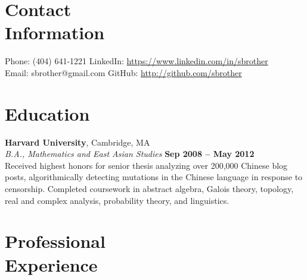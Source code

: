 \documentclass[margin,line]{resume}
\begin{document}
\begin{resume}
    \section{\mysidestyle Contact\\Information}

    Phone: (404) 641-1221       \hfill LinkedIn: \url{https://www.linkedin.com/in/sbrother} \\
    \noindent Email: sbrother@gmail.com  \hfill GitHub: \url{http://github.com/sbrother} \vspace{0mm}\\\vspace{-4.5mm}

    \section{\mysidestyle Education}

    \textbf{Harvard University}, Cambridge, MA \vspace{2mm}\\\vspace{1mm}%
    \textsl{B.A., Mathematics and East Asian Studies} \hfill \textbf{Sep 2008 -- May 2012}\\
    Received highest honors for senior thesis analyzing over 200,000 Chinese blog posts, algorithmically detecting mutations in the Chinese language in response to censorship. Completed coursework in abstract algebra, Galois theory, topology, real and complex analysis, probability theory, and linguistics.

    \section{\mysidestyle Professional\\Experience}


\end{resume}
\end{document}
